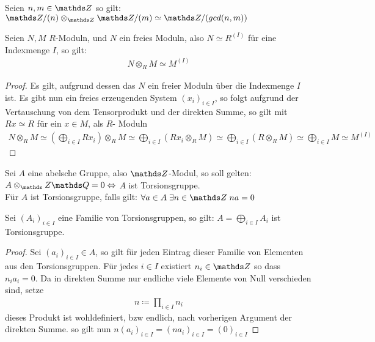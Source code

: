 \documentclass[ngerman, parskip=half, titlepage=false]{scrartcl}
\begin{document}
\begin{Lem}
  Seien $n,m \in \Z$ so gilt: $\Z/(n) \otimes_{\Z} \Z/(m) \simeq \Z/(gcd(n,m))$
\end{Lem}

\begin{Lem}
  Seien $N,M$ $R$-Moduln, und $N$ ein freies Moduln, also
  $N \simeq R^{(I)}$ für eine Indexmenge $I$, so gilt:
  \begin{gather*}
    N \otimes_R M \simeq M^{(I)}
  \end{gather*}
  \begin{proof}
    Es gilt, aufgrund dessen das $N$ ein freier Moduln über die
    Indexmenge $I$ ist.  Es gibt nun ein freies erzeugenden System
    $(x_i)_{i \in I}$, so folgt aufgrund der Vertauschung von dem
    Tensorprodukt und der direkten Summe, so gilt mit $Rx \simeq R$
    für ein $x \in M$, als $R$- Moduln
    \begin{gather*}
      N \otimes_R M 
      \simeq
      ( \bigoplus_{i \in I} R x_i ) \otimes_R M
      \simeq
      \bigoplus_{i \in I} ( R x_i \otimes_R M)
      \simeq
      \bigoplus_{i \in I} ( R  \otimes_R M)
      \simeq
      \bigoplus_{i \in I} M
      \simeq
      M^{(I)}
    \end{gather*}
  \end{proof}
\end{Lem}

\begin{Beh}
  Sei $A$ eine abelsche Gruppe, also $\Z$-Modul, so soll gelten:\\
  $A \otimes_\Z \Q = 0 \Leftrightarrow$ $A$ ist Torsionsgruppe.\\
  Für $A$ ist Torsionsgruppe, falls gilt: $\forall a \in A \; \exists n \in \Z \;
  na = 0$
\end{Beh}

\begin{Lem}
  Sei $(A_i)_{i \in I}$ eine Familie von Torsionsgruppen, so gilt:
  $A = \bigoplus_{i \in I} A_i$ ist Torsionsgruppe.
  \begin{proof}
    Sei $(a_i)_{i \in I} \in A$, so gilt für jeden Eintrag dieser
    Familie von Elementen aus den Torsionsgruppen. Für jedes $i \in I$ existiert
    $n_i \in \Z$ so dass $n_i a_i = 0 $. Da in direkten Summe nur endliche viele 
    Elemente von Null verschieden sind, setze
    \begin{gather*}
      n \coloneqq \prod\limits_{i \in I} n_i
    \end{gather*}
    dieses Produkt ist wohldefiniert, bzw endlich, nach vorherigen Argument der
    direkten Summe.
    so gilt nun $n (a_i)_{i \in I} = (n a_i)_{i \in I} = ( 0 )_{i \in I} $
  \end{proof}
\end{Lem}
\end{document}
